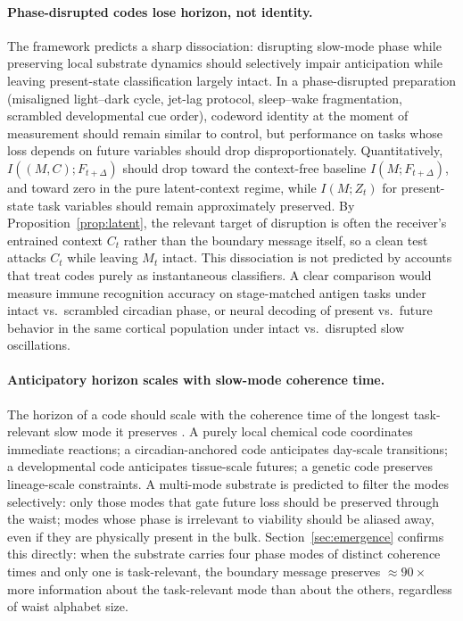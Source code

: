 \documentclass[12pt]{article}
\theoremstyle{definition}
\newcommand{\I}{I}
\begin{document}
\paragraph{Phase-disrupted codes lose horizon, not identity.} The framework predicts a sharp dissociation: disrupting slow-mode phase while preserving local substrate dynamics should selectively impair anticipation while leaving present-state classification largely intact. In a phase-disrupted preparation (misaligned light--dark cycle, jet-lag protocol, sleep--wake fragmentation, scrambled developmental cue order), codeword identity at the moment of measurement should remain similar to control, but performance on tasks whose loss depends on future variables should drop disproportionately. Quantitatively, $\I((M,C);F_{t+\Delta})$ should drop toward the context-free baseline $\I(M;F_{t+\Delta})$, and toward zero in the pure latent-context regime, while $\I(M;Z_t)$ for present-state task variables should remain approximately preserved. By Proposition~\ref{prop:latent}, the relevant target of disruption is often the receiver's entrained context $C_t$ rather than the boundary message itself, so a clean test attacks $C_t$ while leaving $M_t$ intact. This dissociation is not predicted by accounts that treat codes purely as instantaneous classifiers. A clear comparison would measure immune recognition accuracy on stage-matched antigen tasks under intact vs.\ scrambled circadian phase, or neural decoding of present vs.\ future behavior in the same cortical population under intact vs.\ disrupted slow oscillations.

\paragraph{Anticipatory horizon scales with slow-mode coherence time.} The horizon of a code should scale with the coherence time of the longest task-relevant slow mode it preserves \citep{todd2026b_coherencetime}. A purely local chemical code coordinates immediate reactions; a circadian-anchored code anticipates day-scale transitions; a developmental code anticipates tissue-scale futures; a genetic code preserves lineage-scale constraints. A multi-mode substrate is predicted to filter the modes selectively: only those modes that gate future loss should be preserved through the waist; modes whose phase is irrelevant to viability should be aliased away, even if they are physically present in the bulk. Section~\ref{sec:emergence} confirms this directly: when the substrate carries four phase modes of distinct coherence times and only one is task-relevant, the boundary message preserves $\approx 90\times$ more information about the task-relevant mode than about the others, regardless of waist alphabet size.
\end{document}
